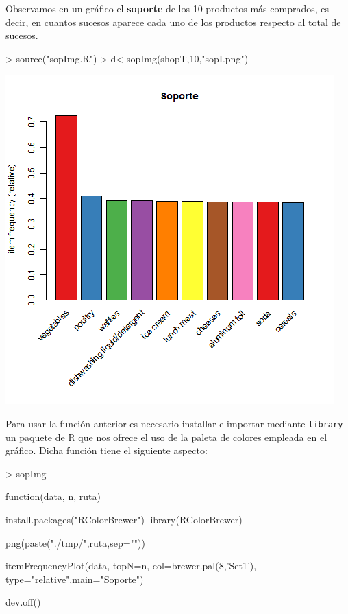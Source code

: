 \documentclass [a4paper] {article}
\begin{document}
{\bigskip
Observamos en un gráfico el \textbf{soporte} de los 10 productos más comprados, es decir, en cuantos
sucesos aparece cada uno de los productos respecto al total de sucesos.
\begin{Schunk}
\begin{Sinput}
> source("sopImg.R")
> d<-sopImg(shopT,10,"sopI.png")
\end{Sinput}
\end{Schunk}
\includegraphics[width=\textwidth]{sopI}

Para usar la función anterior es necesario installar e importar mediante \texttt{library} un paquete de R
que nos ofrece el uso de la paleta de colores empleada en el gráfico. Dicha función tiene el siguiente
aspecto:
\begin{Schunk}
\begin{Sinput}
> sopImg
\end{Sinput}
\begin{Soutput}
function(data, n, ruta) {

    install.packages("RColorBrewer")
    library(RColorBrewer)

    png(paste("./tmp/",ruta,sep=""))

    itemFrequencyPlot(data, topN=n, col=brewer.pal(8,'Set1'),
        type="relative",main="Soporte")

    dev.off()
}
\end{Soutput}
\end{Schunk}

}
\end{document}
